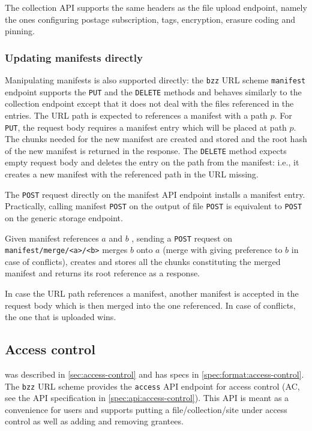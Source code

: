 The collection API supports the same headers as the file upload endpoint, namely the ones configuring postage subscription, tags, encryption, erasure coding and pinning.

\subsubsection{Updating manifests directly}

Manipulating manifests is also supported directly: the \lstinline{bzz} URL scheme \lstinline{manifest} endpoint supports the \lstinline{PUT} and the \lstinline{DELETE} methods and behaves similarly to the collection endpoint except that it does not deal with the files referenced in the entries. The  URL path is expected to references a manifest with a path $p$. For \lstinline{PUT}, the request body requires a manifest entry which will be placed at path $p$. The chunks needed for the new manifest are created and stored and the root  hash of the  new manifest is returned in the response. The  \lstinline{DELETE} method expects empty request body  and deletes the entry on the path from the manifest: i.e., it creates a new manifest with the referenced path in  the URL missing. 

The \lstinline{POST} request directly on the manifest API endpoint installs a manifest entry. Practically, calling manifest     \lstinline{POST} on the output of file \lstinline{POST} is equivalent to \lstinline{POST} on the generic storage endpoint.  

Given manifest references $a$ and $b$ , sending a \lstinline{POST} request on \lstinline{manifest/merge/<a>/<b>} 
merges $b$ onto $a$ (merge with giving preference to $b$ in case of conflicts), creates and stores all the chunks constituting the merged manifest and returns its root reference as a response.


In case the URL path references a manifest, another manifest is accepted in the request body which is then merged into the one referenced. In case of conflicts, the one that is uploaded wins. 


\subsection{Access control \statusgreen}\label{sec:access-control-ux}

 was described in \ref{sec:access-control} and has specs in \ref{spec:format:access-control}. The \lstinline{bzz} URL scheme provides the \lstinline{access} API endpoint for access control (AC, see the API specification in \ref{spec:api:access-control}). This API is meant as a convenience for users and supports putting a file/collection/site under access control as well as adding and removing grantees.

